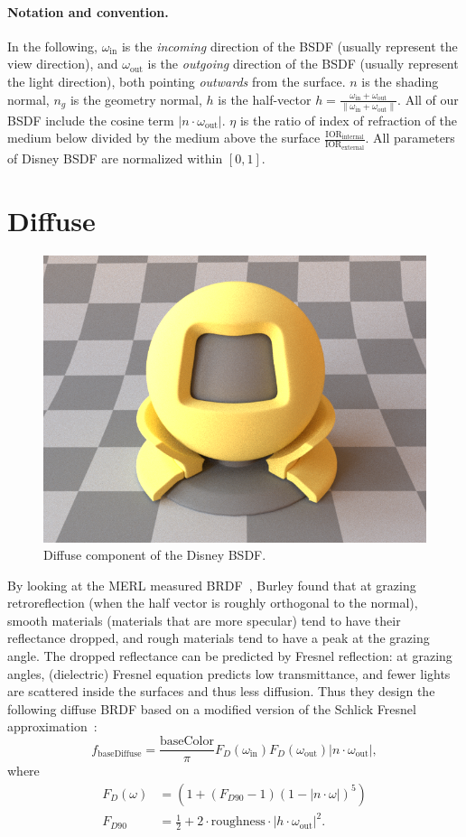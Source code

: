 \paragraph{Notation and convention.} In the following, $\omega_{\text{in}}$ is the \emph{incoming} direction of the BSDF (usually represent the view direction), and $\omega_{\text{out}}$ is the \emph{outgoing} direction of the BSDF (usually represent the light direction), both pointing \emph{outwards} from the surface. $n$ is the shading normal, $n_g$ is the geometry normal, $h$ is the half-vector $h = \frac{\omega_{\text{in}} + \omega_{\text{out}}}{\|\omega_{\text{in}} + \omega_{\text{out}}\|}$. All of our BSDF include the cosine term $|n \cdot \omega_{\text{out}}|$. $\eta$ is the ratio of index of refraction of the medium below divided by the medium above the surface $\frac{\text{IOR}_{\text{internal}}}{\text{IOR}_{\text{external}}}$. All parameters of Disney BSDF are normalized within $[0, 1]$.

\section{Diffuse}
\begin{figure}
	\centering
	\includegraphics[width=0.5\linewidth]{imgs/disney_diffuse.png}
	\caption{Diffuse component of the Disney BSDF.}
\end{figure}

By looking at the MERL measured BRDF~\cite{Matusik:2003:DRM}, Burley found that at grazing retroreflection (when the half vector is roughly orthogonal to the normal), smooth materials (materials that are more specular) tend to have their reflectance dropped, and rough materials tend to have a peak at the grazing angle. The dropped reflectance can be predicted by Fresnel reflection: at grazing angles, (dielectric) Fresnel equation predicts low transmittance, and fewer lights are scattered inside the surfaces and thus less diffusion. Thus they design the following diffuse BRDF based on a modified version of the Schlick Fresnel approximation~\cite{Schlick:1994:IBM}:
\begin{equation}
	f_{\text{baseDiffuse}} = \frac{\text{baseColor}}{\pi}
	F_D(\omega_{\text{in}}) F_D(\omega_{\text{out}}) |n \cdot \omega_{\text{out}}|,
\end{equation}
where
\begin{equation}
\begin{aligned}
F_D(\omega) &= \left(1 + (F_{D90} - 1) (1 - |n \cdot \omega|)^5 \right) \\
F_{D90} &= \frac{1}{2} + 2 \cdot \text{roughness} \cdot |h \cdot \omega_{\text{out}}|^2.
\end{aligned}
\end{equation}


